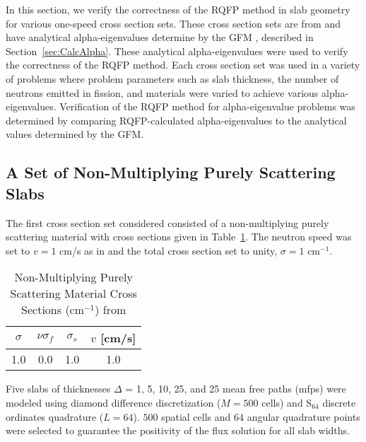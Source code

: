 In this section, we verify the correctness of the RQFP method in slab geometry for various one-speed cross section sets. These cross section sets are from \cite{kornreich_timeeigenvalue_2005} and have analytical alpha-eigenvalues determine by the GFM \cite{kornreich_timeeigenvalue_2005}, described in Section~\ref{sec:CalcAlpha}. These analytical alpha-eigenvalues were used to verify the correctness of the RQFP method. Each cross section set was used in a variety of problems where problem parameters such as slab thickness, the number of neutrons emitted in fission, and materials were varied to achieve various alpha-eigenvalues. Verification of the RQFP method for alpha-eigenvalue problems was determined by comparing RQFP-calculated alpha-eigenvalues to the analytical values determined by the GFM.

\subsection{A Set of Non-Multiplying Purely Scattering Slabs}

The first cross section set considered consisted of a non-multiplying purely scattering material with cross sections given in Table~\ref{table:Betzler}. The neutron speed was set to $v = 1$ cm/s as in \cite{kornreich_timeeigenvalue_2005} and the total cross section set to unity, $\sigma = 1$ cm$^{-1}$.

\begin{table}[!htbp]
    \centering
    \caption{Non-Multiplying Purely Scattering Material Cross Sections (cm$^{-1}$) from \cite{kornreich_timeeigenvalue_2005}}
\label{table:Betzler}
    \begin{tabular}{*4c}
        \toprule
	$\sigma$ & $\nu \sigma_{f}$ & $\sigma_{s}$  & $v$ [cm/s] \\ 
        \midrule
	1.0 & 0.0 & 1.0 & 1.0 \\
        \bottomrule
    \end{tabular}
\end{table}

Five slabs of thicknesses $\Delta$ = 1, 5, 10, 25, and 25 mean free paths (mfps) were modeled using diamond difference discretization ($M = 500$ cells) and S$_{64}$ discrete ordinates quadrature ($L = 64$). $500$ spatial cells and $64$ angular quadrature points were selected to guarantee the positivity of the flux solution for all slab widths.

